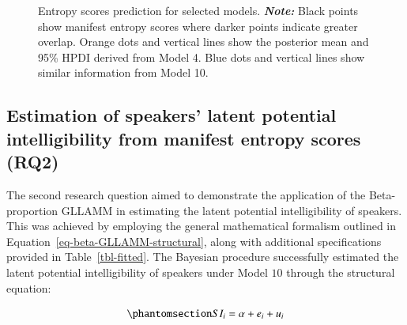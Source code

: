\documentclass[
  authoryear,
  preprint,
  1p]{elsarticle}
\begin{document}
\label{cell-fig-rq1-pred-speaker}
\begin{figure}[H]


\caption{\label{fig-rq1-pred-speaker}Entropy scores prediction for
selected models. {\textbf{\emph{Note:}} Black points show manifest
entropy scores where darker points indicate greater overlap. Orange dots
and vertical lines show the posterior mean and 95\% HPDI derived from
Model 4. Blue dots and vertical lines show similar information from
Model 10.}}

\end{figure}%

\subsection{Estimation of speakers' latent potential intelligibility
from manifest entropy scores (RQ2)}\label{sec-R-RQ2}

The second research question aimed to demonstrate the application of the
Beta-proportion GLLAMM in estimating the latent potential
intelligibility of speakers. This was achieved by employing the general
mathematical formalism outlined in
Equation~\ref{eq-beta-GLLAMM-structural}, along with additional
specifications provided in Table~\ref{tbl-fitted}. The Bayesian
procedure successfully estimated the latent potential intelligibility of
speakers under Model \(10\) through the structural equation:

\begin{equation}\phantomsection\label{eq-beta-GLLAMM-structural-model10}{
SI_{i} = \alpha + e_{i} + u_{i}
}\end{equation}
\end{document}
